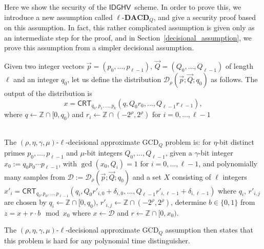 \documentclass[11pt]{llncs}
\newcommand{\Z}{{\mathbb Z}}
\newcommand*{\crt}{\ensuremath{\mathsf{CRT}}}
\newcommand*{\CDGHV}{\ensuremath{\mathsf{IDGHV}}}
\newcommand*\D{\ensuremath{\mathcal D}}
\begin{document}
Here we show the security of the \CDGHV\ scheme.  In order to prove this, we introduce a new assumption called $\ell$-$\mathbf{DACD}_Q$, and give a security proof based on this assumption.  In fact, this rather complicated assumption is given only as an intermediate step for the proof, and in Section~\ref{decisional_assumption}, we prove this assumption from a simpler decisional assumption.

Given two integer vectors $\vec{p}=(p_0, \dots, p_{\ell-1})$, $\vec{Q}=(Q_0, \dots, Q_{\ell-1})$ of length $\ell$ and an integer $q_0$, let us define the distribution $\D_\rho(\vec{p}; \vec{Q}; q_0)$ as follows.  The output of the distribution is
\[
x=\crt_{q_0,p_1,\dots,p_k}(q,Q_0r_0,\dots,Q_{\ell-1}r_{\ell-1}),
\]
where $q\gets\Z\cap[0,q_0)$ and $r_i\gets\Z\cap(-2^\rho,2^\rho)$ for $i=0,\dots,\ell-1$

\begin{definition} \\
The $(\rho,\eta,\gamma,\mu)$-$\ell$-decisional approximate GCD$_Q$ problem is: for $\eta$-bit distinct primes $p_0,\dots,p_{\ell-1}$ and $\mu$-bit integers $Q_0,\dots,Q_{\ell-1}$, given a $\gamma$-bit integer  $x_0:=q_0p_0\cdots p_{\ell-1}$, with $\gcd(x_0,Q_i)=1$ for $i=0,\dots,\ell-1$, and  %
polynomially many samples from $\D:=\D_{\rho}(\vec{p};\vec{Q};q_0)$ and a set $X$ consisting of $\ell$ integers $x'_i=\crt_{q_0,p_0,\dots,p_{\ell-1}}(q_i,Q_0r'_{i,0}+\delta_{i,0},\dots,Q_{\ell-1}r'_{i,\ell-1}+\delta_{i,\ell-1})$ where $q_i$, $r'_{i,j}$ are chosen by
$q_i\gets\Z\cap[0,q_0)$, $r'_{i,j}\gets\Z\cap(-2^\rho,2^\rho)$, determine $b\in\{0,1\}$ from $z=x+r\cdot b\mod x_0$ where $x\gets\D$ and $r\gets\Z\cap[0,x_0)$.
\end{definition}

The $(\rho,\eta,\gamma,\mu)$-$\ell$-decisional approximate GCD$_Q$ assumption then states that this problem is hard for any polynomial time distinguisher.
\end{document}
